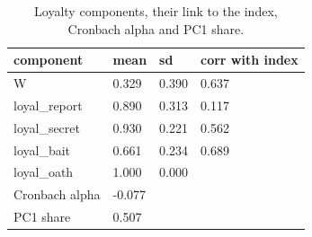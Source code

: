 \begin{table}[t]
\centering
\small
\begin{tabular}{llll}
\toprule
component & mean & sd & corr with index \\
\midrule
W & 0.329 & 0.390 & 0.637 \\
loyal\_report & 0.890 & 0.313 & 0.117 \\
loyal\_secret & 0.930 & 0.221 & 0.562 \\
loyal\_bait & 0.661 & 0.234 & 0.689 \\
loyal\_oath & 1.000 & 0.000 &  \\
Cronbach alpha & -0.077 &  &  \\
PC1 share & 0.507 &  &  \\
\bottomrule
\end{tabular}
\caption{Loyalty components, their link to the index, Cronbach alpha and PC1 share.}
\label{tab:T4_loyalty}
\end{table}